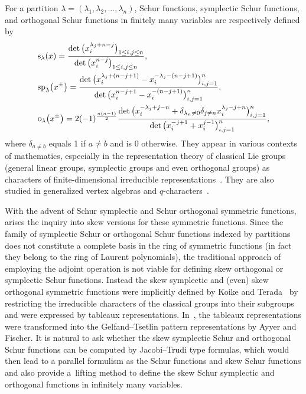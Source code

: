 \documentclass[pdftex]{sigma}
\numberwithin{equation}{section}
\begin{document}
For a partition $\lambda=(\lambda_1,\lambda_2,\ldots,\lambda_n)$, Schur functions, symplectic Schur functions, and orthogonal Schur functions in finitely many variables are respectively defined by~\cite{Mac1995,Me2019,Sta1999,Su1990}
\begin{align}
\label{e:s50}&{\rm s}_\lambda(x)=\frac{\det\big(x^{\lambda_j+n-j}_i\big)_{1\leq i,j\leq n}}{\det\big(x^{n-j}_i\big)_{1\leq i,j\leq n}},\\
\label{e:sp50}&{\rm sp}_\lambda\big(x^{\pm}\big)=\frac{\det\big(x^{\lambda_j+(n-j+1)}_i-x^{-\lambda_j-(n-j+1)}_i\big)^n_{i,j=1}}{\det\big(x^{n-j+1}_i-x^{-(n-j+1)}_i\big)^n_{i,j=1}},\\
\label{e:o50}&{\rm o}_\lambda\big(x^{\pm}\big)=2(-1)^{\frac{n(n-1)}{2}}\frac{\det\big(x^{-\lambda_j+j-n}_i+\delta_{\lambda_n\neq0}\delta_{j\neq n}x^{\lambda_j-j+n}_i\big)^n_{i,j=1}}{\det\big(x^{-j+1}_i+x^{j-1}_i\big)^n_{i,j=1}},
\end{align}
where $\delta_{a\neq b}$ equals 1 if $a\neq b$ and is $0$ otherwise.
They appear in various contexts of mathematics, especially in the representation theory of classical Lie groups (general linear groups, symplectic groups and
even orthogonal groups) as characters of finite-dimensional irreducible representations~\cite{KT1987,Lw1950,Su1990,Wey1946}. They are also
studied in generalized vertex algebras and $q$-characters~\cite{CG2020, LTW2016}.

With the advent of Schur symplectic and Schur orthogonal symmetric functions, arises the inquiry into skew versions for these symmetric functions.
Since the family of symplectic Schur or orthogonal Schur functions indexed by partitions does not constitute a complete basis in the ring of symmetric functions (in fact they belong to the ring of Laurent polynomials), the traditional approach of employing the adjoint operation is not viable for defining skew orthogonal or symplectic Schur functions. Instead the skew symplectic and (even) skew orthogonal symmetric functions were implicitly defined by
Koike and Terada~\cite{KT1990} by restricting the irreducible characters of the classical groups into their subgroups and were
expressed by tableaux representations. In~\cite{AF2020}, the tableaux representations were transformed into the Gelfand--Tsetlin pattern
representations by Ayyer and Fischer. It is natural to ask whether the skew symplectic Schur and orthogonal Schur functions can be computed by
Jacobi--Trudi type formulas, which would then lead to a parallel formulism as the Schur functions and skew Schur functions and also provide
a~lifting method to define the skew Schur symplectic and orthogonal functions in infinitely many variables.
\end{document}
